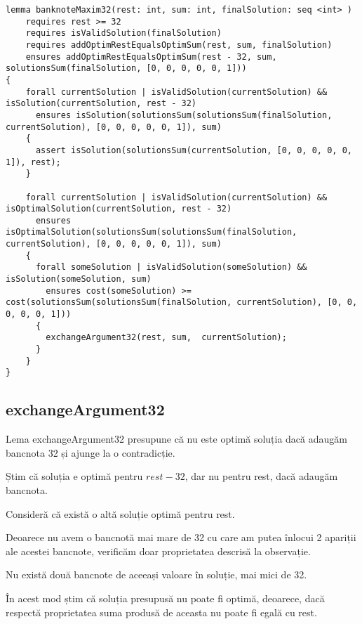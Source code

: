 \begin{lstlisting}
lemma banknoteMaxim32(rest: int, sum: int, finalSolution: seq <int> )
    requires rest >= 32
    requires isValidSolution(finalSolution)
    requires addOptimRestEqualsOptimSum(rest, sum, finalSolution)
    ensures addOptimRestEqualsOptimSum(rest - 32, sum, solutionsSum(finalSolution, [0, 0, 0, 0, 0, 1])) 
{
    forall currentSolution | isValidSolution(currentSolution) && isSolution(currentSolution, rest - 32)
      ensures isSolution(solutionsSum(solutionsSum(finalSolution, currentSolution), [0, 0, 0, 0, 0, 1]), sum) 
    {
      assert isSolution(solutionsSum(currentSolution, [0, 0, 0, 0, 0, 1]), rest);
    }
  
    forall currentSolution | isValidSolution(currentSolution) && isOptimalSolution(currentSolution, rest - 32)
      ensures isOptimalSolution(solutionsSum(solutionsSum(finalSolution, currentSolution), [0, 0, 0, 0, 0, 1]), sum)
    {
      forall someSolution | isValidSolution(someSolution) && isSolution(someSolution, sum)
        ensures cost(someSolution) >= cost(solutionsSum(solutionsSum(finalSolution, currentSolution), [0, 0, 0, 0, 0, 1])) 
      {
        exchangeArgument32(rest, sum,  currentSolution);
      }
    }
}
\end{lstlisting}


\subsection{exchangeArgument32}
Lema exchangeArgument32 presupune că nu este optimă soluția dacă adaugăm bancnota 32 și ajunge la o contradicție.\par
Știm că soluția e optimă pentru $rest - 32$, dar nu pentru rest, dacă adaugăm bancnota.\par
Consideră că există o altă soluție optimă pentru rest.\par
Deoarece nu avem o bancnotă mai mare de 32 cu care am putea înlocui 2 apariții ale acestei bancnote,
verificăm doar proprietatea descrisă la observație.\par
Nu există două bancnote de aceeași valoare în soluție, mai mici de 32.\par
În acest mod știm că soluția presupusă nu poate fi optimă, deoarece, dacă respectă proprietatea
suma produsă de aceasta nu poate fi egală cu rest. \par

